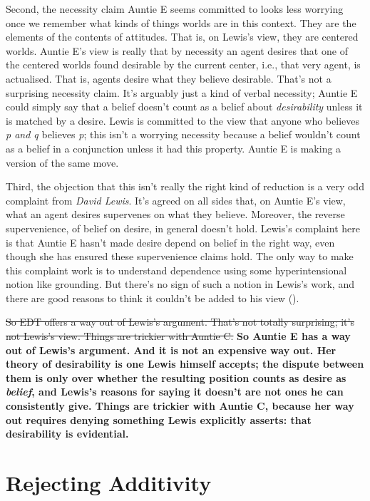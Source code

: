 \documentclass[
  11pt,
  letterpaper,
  DIV=11,
  numbers=noendperiod,
  twoside]{scrartcl}
\begin{document}
Second, the necessity claim Auntie E seems committed to looks less
worrying once we remember what kinds of things worlds are in this
context. They are the elements of the contents of attitudes. That is, on
Lewis's view, they are centered worlds. Auntie E's view is really that
by necessity an agent desires that one of the centered worlds found
desirable by the current center, i.e., that very agent, is actualised.
That is, agents desire what they believe desirable. That's not a
surprising necessity claim. It's arguably just a kind of verbal
necessity; Auntie E could simply say that a belief doesn't count as a
belief about \emph{desirability} unless it is matched by a desire. Lewis
is committed to the view that anyone who believes \emph{p and q}
believes \emph{p}; this isn't a worrying necessity because a belief
wouldn't count as a belief in a conjunction unless it had this property.
Auntie E is making a version of the same move.

Third, the objection that this isn't really the right kind of reduction
is a very odd complaint from \emph{David Lewis}. It's agreed on all
sides that, on Auntie E's view, what an agent desires supervenes on what
they believe. Moreover, the reverse supervenience, of belief on desire,
in general doesn't hold. Lewis's complaint here is that Auntie E hasn't
made desire depend on belief in the right way, even though she has
ensured these supervenience claims hold. The only way to make this
complaint work is to understand dependence using some hyperintensional
notion like grounding. But there's no sign of such a notion in Lewis's
work, and there are good reasons to think it couldn't be added to his
view ().

\sout{So EDT offers a way out of Lewis's argument. That's not totally
surprising; it's not Lewis's view. Things are trickier with Auntie C.}
{\bfseries\boldmath{}So Auntie E has a way out of Lewis's argument. And
it is not an expensive way out. Her theory of desirability is one Lewis
himself accepts; the dispute between them is only over whether the
resulting position counts as desire as \emph{belief}, and Lewis's
reasons for saying it doesn't are not ones he can consistently give.
Things are trickier with Auntie C, because her way out requires denying
something Lewis explicitly asserts: that desirability is evidential.}

\section{Rejecting Additivity}\label{sec-auntie-c}
\end{document}
